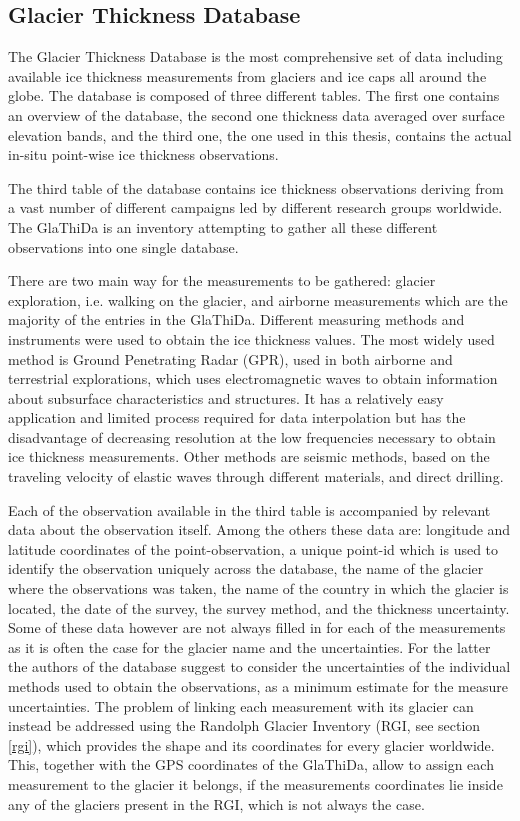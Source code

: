 \subsection{Glacier Thickness Database}
The Glacier Thickness Database \citep{GlaThiDa2014} is the most comprehensive set of data including available ice thickness measurements from glaciers and ice caps all around the globe. The database is composed of three different tables. The first one contains an overview of the database, the second one thickness data averaged over surface elevation bands, and the third one, the one used in this thesis, contains the actual in-situ point-wise ice thickness observations. 

The third table of the database contains ice thickness observations deriving from a vast number of different campaigns led by different research groups worldwide. The GlaThiDa is an inventory attempting to gather all these different observations into one single database.
 
There are two main way for the measurements to be gathered: glacier exploration, i.e. walking on the glacier, and airborne measurements which are the majority of the entries in the GlaThiDa. Different measuring methods and instruments were used to obtain the ice thickness values. The most widely used method is Ground Penetrating Radar (GPR), used in both airborne and terrestrial explorations, which uses electromagnetic waves to obtain information about subsurface characteristics and structures. It has a relatively easy application and limited process required for data interpolation but has the disadvantage of decreasing resolution at the low frequencies \citep{van2012} necessary to obtain ice thickness measurements. Other methods are seismic methods, based on the traveling velocity of elastic waves through different materials, and direct drilling.

Each of the observation available in the third table is accompanied by relevant data about the observation itself. Among the others these data are: longitude and latitude coordinates of the point-observation, a unique point-id which is used to identify the observation uniquely across the database, the name of the glacier where the observations was taken, the name of the country in which the glacier is located, the date of the survey, the survey method, and the thickness uncertainty. Some of these data however are not always filled in for each of the measurements as it is often the case for the glacier name and the uncertainties. For the latter the authors of the database suggest to consider the uncertainties of the individual methods used to obtain the observations,  as a minimum estimate for the measure uncertainties. The problem of linking each measurement with its glacier can instead be addressed using the Randolph Glacier Inventory (RGI, see section \ref{rgi}), which provides the shape and its coordinates for every glacier worldwide. This, together with the GPS coordinates of the GlaThiDa, allow to assign each measurement to the glacier it belongs, if the measurements coordinates lie inside any of the glaciers present in the RGI, which is not always the case. 

